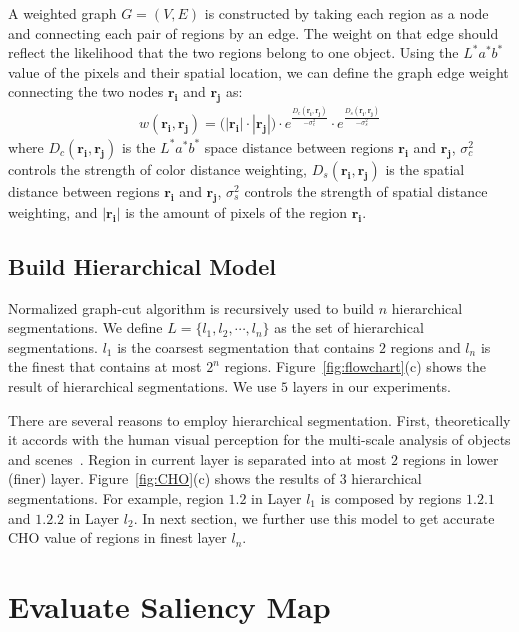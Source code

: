 \documentclass{article}
\begin{document}
A weighted graph $G=(V,E)$ is constructed by taking each region as a node and connecting each pair of regions by an edge. The weight on that edge should reflect the likelihood that the two regions belong to one object. Using the $L^*a^*b^*$ value of the pixels and their spatial location, we can define the graph edge weight connecting the two nodes $\mathbf{r_i}$ and $\mathbf{r_j}$ as:
\begin{eqnarray}
	w(\mathbf{r_i},\mathbf{r_j}) = \big(|\mathbf{r_i}|\cdot|\mathbf{r_j}|\big)\cdot e^{\frac{D_c(\mathbf{r_i},\mathbf{r_j})}{-\sigma_c^2}}\cdot e^{\frac{D_s(\mathbf{r_i},\mathbf{r_j})}{-\sigma_s^2}}
\end{eqnarray}
where $D_c(\mathbf{r_i},\mathbf{r_j})$ is the $L^*a^*b^*$ space distance between regions $\mathbf{r_i}$ and $\mathbf{r_j}$, $\sigma_c^2$ controls the strength of color distance weighting, $D_s(\mathbf{r_i},\mathbf{r_j})$ is the spatial distance between regions $\mathbf{r_i}$ and $\mathbf{r_j}$, $\sigma_s^2$ controls the strength of spatial distance weighting, and $|\mathbf{r_i}|$ is the amount of pixels of the region $\mathbf{r_i}$.

\subsection{Build Hierarchical Model}
Normalized graph-cut algorithm is recursively used to build $n$ hierarchical segmentations. We define $L = \{l_1, l_2,\cdots,l_n\}$ as the set of hierarchical segmentations. $l_1$ is the coarsest segmentation that contains $2$ regions and $l_n$ is the finest that contains at most $2^n$ regions. Figure~\ref{fig:flowchart}(c) shows the result of hierarchical segmentations. We use $5$ layers in our experiments.

There are several reasons to employ hierarchical segmentation. First, theoretically it accords with the human visual perception for the multi-scale analysis of objects and scenes~\cite{palmer1999vision}. Region in current layer is separated into at most $2$ regions in lower (finer) layer. Figure~\ref{fig:CHO}(c) shows the results of $3$ hierarchical segmentations. For example, region $1.2$ in Layer $l_1$ is composed by regions $1.2.1$ and $1.2.2$ in Layer $l_2$. In next section, we further use this model to get accurate CHO value of regions in finest layer $l_n$.

\section{Evaluate Saliency Map}
\end{document}
